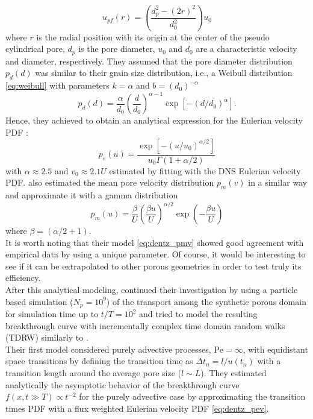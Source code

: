 \begin{equation}\label{eq:dentz_poiseuille}
u_{pf}(r)=\left(\frac{d_p^2-(2r)^2}{d_0^2}\right)u_0
\end{equation}
where $r$ is the radial position with its origin at the center of the pseudo cylindrical pore, $d_p$ is the pore diameter, $u_0$ and $d_0$ are a characteristic velocity and diameter, respectively.
They assumed that the pore diameter distribution $p_d(d)$ was similar to their grain size distribution, i.e., a Weibull distribution \eqref{eq:weibull} with parameters $k=\alpha$ and $b=(d_0)^{-\alpha}$
\[
p_d(d)=\frac{\alpha}{d_0}\left(\frac{d}{d_0}\right)^{\alpha-1}\exp[-(d/d_0)^\alpha].
\]
Hence, they achieved to obtain an analytical expression for the Eulerian velocity PDF :
\begin{equation}\label{eq:dentz_pev}
p_e(u)=\frac{\exp[-(u/u_0)^{\alpha/2}]}{u_0\Gamma(1+\alpha/2)}
\end{equation}
with $\alpha\approx2.5$ and $v_0\approx2.1U$ estimated by fitting with the DNS Eulerian velocity PDF.
\citeauthor{Dentz2017} also estimated the mean pore velocity distribution $p_m(v)$ in a similar way and approximate it with a gamma distribution
\begin{equation}\label{eq:dentz_pmv}
p_m(u)=\frac{\beta}{U}\left(\frac{\beta u}{U}\right)^{\alpha/2}\exp\left(-\frac{\beta u}{U}\right) 
\end{equation}
where $\beta=(\alpha/2+1)$.\\
It is worth noting that their model \eqref{eq:dentz_pmv} showed good agreement with empirical data by using a unique parameter. Of course, it would be interesting to see if it can be extrapolated to other porous geometries in order to test truly its efficiency.\\
After this analytical modeling, \citeauthor{Dentz2017} continued their investigation by using a particle based simulation ($N_p=10^9$) of the transport among the synthetic porous domain for simulation time up to $t/T=10^2$ and tried to model the resulting breakthrough curve with incrementally complex time domain random walks (TDRW) similarly to \citeauthor{Puyguiraud2019}.\\
Their first model considered purely advective processes, $\mathrm{Pe}=\infty$, with equidistant space transitions by defining the transition time as $\Delta t_n=l/u(t_n)$ with a transition length around the average pore size ($l\sim L$). 
They estimated analytically the asymptotic behavior of the breakthrough curve $f(x,t\gg T)\propto t^{-2}$ for the purely advective case by approximating the transition times PDF with a flux weighted Eulerian velocity PDF \eqref{eq:dentz_pev}.\\
